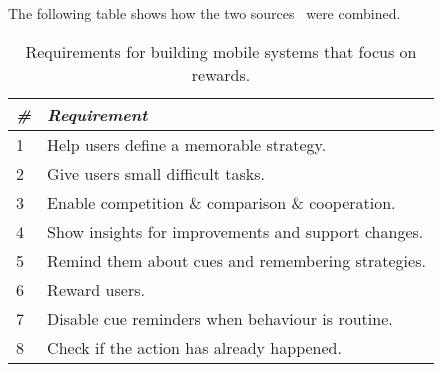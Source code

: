 The following table shows how the two sources~\cite{thesis_kathy, article_taxonomy_motivational_affordances_meaningful} were combined.

\begin{table}
  \centering
  \begin{tabular}{l | l}
    {\small\textit{\#}}
    & {\small \textit{Requirement}}\\
    \midrule
    1 & Help users define a memorable strategy. \\
    2 & Give users small difficult tasks. \\
    3 & Enable competition \& comparison \& cooperation. \\
    4 & Show insights for improvements and support changes. \\
    5 & Remind them about cues and remembering strategies. \\
    6 & Reward users. \\
    7 & Disable cue reminders when behaviour is routine. \\
    8 & Check if the action has already happened. \\
  \end{tabular}
  \caption{Requirements for building mobile systems that focus on rewards.}~\label{tab:requirements_mine}
\end{table}


